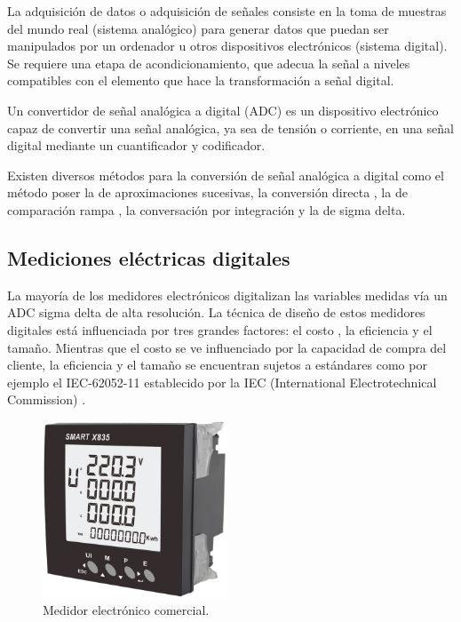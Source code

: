 La adquisición de datos o adquisición de señales consiste en la toma de muestras del mundo real (sistema analógico) para generar datos que puedan ser manipulados por un ordenador u otros dispositivos electrónicos (sistema digital). Se requiere una etapa de acondicionamiento, que adecua la señal a niveles compatibles con el elemento que hace la transformación a señal digital\cite{NIDataAdquisition}.

Un convertidor de señal analógica a digital (ADC) es un dispositivo electrónico capaz de convertir una señal analógica, ya sea de tensión o corriente, en una señal digital mediante un cuantificador y codificador.

Existen diversos métodos para la conversión de señal analógica a digital como el método poser la de aproximaciones sucesivas, la conversión directa , la de comparación rampa , la conversación por integración y  la de sigma delta\cite{Conversores}.

\subsection{Mediciones eléctricas digitales}

La mayoría de los medidores electrónicos digitalizan las variables medidas vía un ADC sigma delta  de alta resolución. La técnica de diseño de estos medidores digitales está influenciada por tres grandes factores: el costo , la eficiencia y el tamaño. Mientras que el costo se ve influenciado por la capacidad de compra del cliente, la eficiencia y el tamaño se encuentran sujetos a estándares como por ejemplo el IEC-62052-11 establecido por la IEC (International Electrotechnical Commission) \cite{articleDM}.


\begin{figure}[h]
	\centering
	\includegraphics[width=55mm,keepaspectratio]{Figures/3931_1.png}
	\caption{Medidor electrónico comercial.}
	\label{fig:texmaker}
\end{figure}

